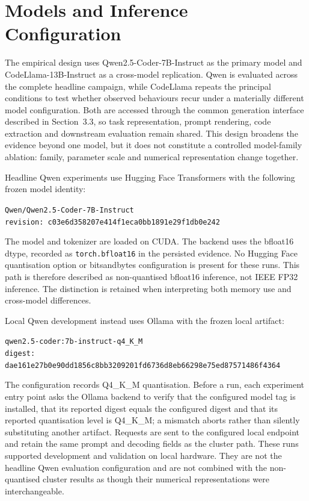 \section{Models and Inference Configuration}
\label{sec:models-inference}

The empirical design uses Qwen2.5-Coder-7B-Instruct as the primary model and CodeLlama-13B-Instruct as a cross-model replication. Qwen is evaluated across the complete headline campaign, while CodeLlama repeats the principal conditions to test whether observed behaviours recur under a materially different model configuration. Both are accessed through the common generation interface described in Section~3.3, so task representation, prompt rendering, code extraction and downstream evaluation remain shared. This design broadens the evidence beyond one model, but it does not constitute a controlled model-family ablation: family, parameter scale and numerical representation change together.

Headline Qwen experiments use Hugging Face Transformers with the following frozen model identity:
\begin{center}
    \small\texttt{Qwen/Qwen2.5-Coder-7B-Instruct}\\
    \texttt{revision: c03e6d358207e414f1eca0bb1891e29f1db0e242}
\end{center}
\nopagebreak[4]
The model and tokenizer are loaded on CUDA. The backend uses the bfloat16 dtype, recorded as \texttt{torch.bfloat16} in the persisted evidence. No Hugging Face quantisation option or bitsandbytes configuration is present for these runs. This path is therefore described as non-quantised bfloat16 inference, not IEEE FP32 inference. The distinction is retained when interpreting both memory use and cross-model differences.

Local Qwen development instead uses Ollama with the frozen local artifact:
\begin{center}
    \small\texttt{qwen2.5-coder:7b-instruct-q4\_K\_M}\\
    \scriptsize\texttt{digest: dae161e27b0e90dd1856c8bb3209201fd6736d8eb66298e75ed87571486f4364}
\end{center}
The configuration records Q4\_K\_M quantisation. Before a run, each experiment entry point asks the Ollama backend to verify that the configured model tag is installed, that its reported digest equals the configured digest and that its reported quantisation level is Q4\_K\_M; a mismatch aborts rather than silently substituting another artifact. Requests are sent to the configured local endpoint and retain the same prompt and decoding fields as the cluster path. These runs supported development and validation on local hardware. They are not the headline Qwen evaluation configuration and are not combined with the non-quantised cluster results as though their numerical representations were interchangeable.

